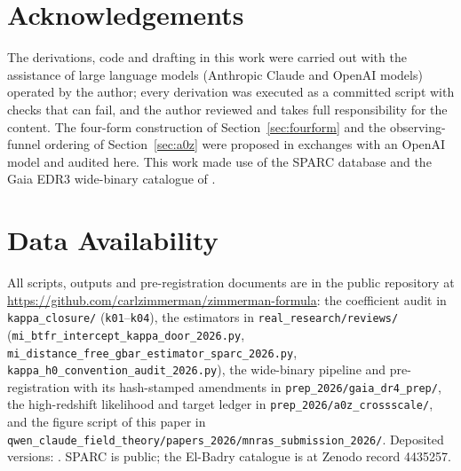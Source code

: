 \documentclass[fleqn,usenatbib]{mnras}
\begin{document}
\section*{Acknowledgements}
The derivations, code and drafting in this work were carried out with the assistance of large language models (Anthropic Claude and OpenAI models) operated by the author; every derivation was executed as a committed script with checks that can fail, and the author reviewed and takes full responsibility for the content. The four-form construction of Section~\ref{sec:fourform} and the observing-funnel ordering of Section~\ref{sec:a0z} were proposed in exchanges with an OpenAI model and audited here. This work made use of the SPARC database \citep{Lelli2016} and the Gaia EDR3 wide-binary catalogue of \citet{ElBadry2021}.

\section*{Data Availability}
All scripts, outputs and pre-registration documents are in the public repository at \url{https://github.com/carlzimmerman/zimmerman-formula}: the coefficient audit in \texttt{kappa\_closure/} (\texttt{k01}--\texttt{k04}), the estimators in \texttt{real\_research/reviews/} (\texttt{mi\_btfr\_intercept\_kappa\_door\_2026.py}, \texttt{mi\_distance\_free\_gbar\_estimator\_sparc\_2026.py}, \texttt{kappa\_h0\_convention\_audit\_2026.py}), the wide-binary pipeline and pre-registration with its hash-stamped amendments in \texttt{prep\_2026/gaia\_dr4\_prep/}, the high-redshift likelihood and target ledger in \texttt{prep\_2026/a0z\_crossscale/}, and the figure script of this paper in \texttt{qwen\_claude\_field\_theory/papers\_2026/mnras\_submission\_2026/}. Deposited versions: \citet{Zimmerman2026kappa,Zimmerman2026a0z,Zimmerman2026prereg}. SPARC is public; the El-Badry catalogue is at Zenodo record 4435257.




\bsp
\label{lastpage}
\end{document}
